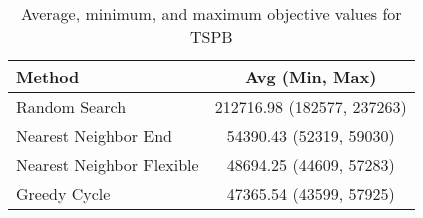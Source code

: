 \begin{table}[h!]
\centering
\begin{tabular}{lc}
\hline
Method & Avg (Min, Max) \\
\hline
Random Search & 212716.98 (182577, 237263) \\
Nearest Neighbor End & 54390.43 (52319, 59030) \\
Nearest Neighbor Flexible & 48694.25 (44609, 57283) \\
Greedy Cycle & 47365.54 (43599, 57925) \\
\hline
\end{tabular}
\caption{Average, minimum, and maximum objective values for TSPB}
\label{tab:TSPB_results}
\end{table}

